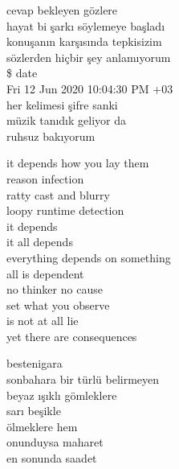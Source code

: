 \documentclass[10pt, openright, oneside]{memoir}
\theoremstyle{definition}
\begin{document}
\vspace*{\fill}
%
\newpage
{}
\vspace*{\fill}
\settowidth{\versewidth}{hayat bi şarkı söylemeye başladı}
\begin{cverse}
  cevap bekleyen gözlere \\
  hayat bi şarkı söylemeye başladı \\
  konuşanın karşısında tepkisizim \\
  sözlerden hiçbir şey anlamıyorum \\
  \ttfamily
  \$ date \\
  Fri 12 Jun 2020 10:04:30 PM +03 \\
  \normalfont{}
  her kelimesi şifre sanki \\
  müzik tanıdık geliyor da \\
  ruhsuz bakıyorum \\
\end{cverse}
\vspace*{\fill}
%
\newpage
{}
\vspace*{\fill}
\settowidth{\versewidth}{everything depends on something}
\begin{cverse}
  it depends how you lay them \\
  reason infection \\
  ratty cast and blurry \\
  loopy runtime detection \\
  it depends \\
  it all depends \\
  everything depends on something \\
  all is dependent \\
  no thinker no cause \\
  set what you observe \\
  is not at all lie \\
  yet there are consequences \\
\end{cverse}
\vspace*{\fill}
%
\newpage
{}
\vspace*{\fill}
\settowidth{\versewidth}{sonbahara bir türlü belirmeyen}
\begin{cverse}
  bestenigara \\
  sonbahara bir türlü belirmeyen \\
  beyaz ışıklı gömleklere \\
  sarı beşikle \\
  ölmeklere hem \\
  onunduysa maharet \\
  en sonunda saadet \\
\end{cverse}
\end{document}

